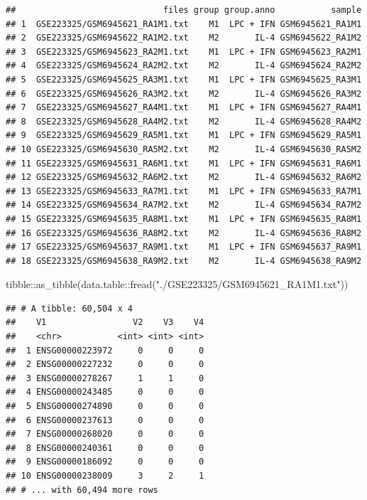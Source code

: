 \documentclass[
]{article}
\newenvironment{Shaded}{\begin{snugshade}}{\end{snugshade}}
\newcommand{\FunctionTok}[1]{\textcolor[rgb]{0.00,0.00,0.00}{#1}}
\newcommand{\NormalTok}[1]{#1}
\newcommand{\SpecialCharTok}[1]{\textcolor[rgb]{0.00,0.00,0.00}{#1}}
\newcommand{\StringTok}[1]{\textcolor[rgb]{0.31,0.60,0.02}{#1}}
\begin{document}
\begin{verbatim}
##                             files group group.anno           sample
## 1  GSE223325/GSM6945621_RA1M1.txt    M1  LPC + IFN GSM6945621_RA1M1
## 2  GSE223325/GSM6945622_RA1M2.txt    M2       IL-4 GSM6945622_RA1M2
## 3  GSE223325/GSM6945623_RA2M1.txt    M1  LPC + IFN GSM6945623_RA2M1
## 4  GSE223325/GSM6945624_RA2M2.txt    M2       IL-4 GSM6945624_RA2M2
## 5  GSE223325/GSM6945625_RA3M1.txt    M1  LPC + IFN GSM6945625_RA3M1
## 6  GSE223325/GSM6945626_RA3M2.txt    M2       IL-4 GSM6945626_RA3M2
## 7  GSE223325/GSM6945627_RA4M1.txt    M1  LPC + IFN GSM6945627_RA4M1
## 8  GSE223325/GSM6945628_RA4M2.txt    M2       IL-4 GSM6945628_RA4M2
## 9  GSE223325/GSM6945629_RA5M1.txt    M1  LPC + IFN GSM6945629_RA5M1
## 10 GSE223325/GSM6945630_RA5M2.txt    M2       IL-4 GSM6945630_RA5M2
## 11 GSE223325/GSM6945631_RA6M1.txt    M1  LPC + IFN GSM6945631_RA6M1
## 12 GSE223325/GSM6945632_RA6M2.txt    M2       IL-4 GSM6945632_RA6M2
## 13 GSE223325/GSM6945633_RA7M1.txt    M1  LPC + IFN GSM6945633_RA7M1
## 14 GSE223325/GSM6945634_RA7M2.txt    M2       IL-4 GSM6945634_RA7M2
## 15 GSE223325/GSM6945635_RA8M1.txt    M1  LPC + IFN GSM6945635_RA8M1
## 16 GSE223325/GSM6945636_RA8M2.txt    M2       IL-4 GSM6945636_RA8M2
## 17 GSE223325/GSM6945637_RA9M1.txt    M1  LPC + IFN GSM6945637_RA9M1
## 18 GSE223325/GSM6945638_RA9M2.txt    M2       IL-4 GSM6945638_RA9M2
\end{verbatim}

\begin{Shaded}
\begin{Highlighting}[]
\NormalTok{tibble}\SpecialCharTok{::}\FunctionTok{as\_tibble}\NormalTok{(data.table}\SpecialCharTok{::}\FunctionTok{fread}\NormalTok{(}\StringTok{"./GSE223325/GSM6945621\_RA1M1.txt"}\NormalTok{))}
\end{Highlighting}
\end{Shaded}

\begin{verbatim}
## # A tibble: 60,504 x 4
##    V1                 V2    V3    V4
##    <chr>           <int> <int> <int>
##  1 ENSG00000223972     0     0     0
##  2 ENSG00000227232     0     0     0
##  3 ENSG00000278267     1     1     0
##  4 ENSG00000243485     0     0     0
##  5 ENSG00000274890     0     0     0
##  6 ENSG00000237613     0     0     0
##  7 ENSG00000268020     0     0     0
##  8 ENSG00000240361     0     0     0
##  9 ENSG00000186092     0     0     0
## 10 ENSG00000238009     3     2     1
## # ... with 60,494 more rows
\end{verbatim}
\end{document}
